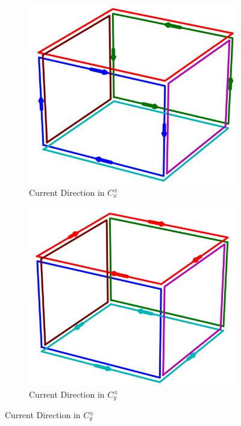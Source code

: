 \begin{figure}
    \begin{subfigure}{.5\linewidth}
        \centering
        \includegraphics[scale=.28]{Images/c1_4}
        \caption{Current Direction in $C_x^{\pm}$}
        \label{fig:c1}
    \end{subfigure}%
    \begin{subfigure}{.5\linewidth}
        \centering
        \includegraphics[scale=.28]{Images/c3_4}
        \caption{Current Direction in $C_y^{\pm}$}

\end{subfigure}
\end{figure}
